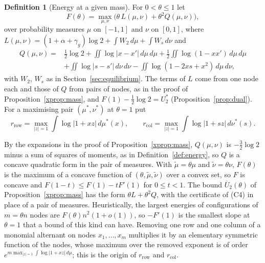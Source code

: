 \documentclass[11pt]{article}
\theoremstyle{definition}
\newtheorem{definition}[theorem]{Definition}
\begin{document}
\begin{definition}[Energy at a given mass]\label{xdef:Fmass}
For $0<\theta\le1$ let
\[
F(\theta)=\max_{\mu,\nu}\Big(\theta\,L(\mu,\nu)+\theta^2Q(\mu,\nu)\Big),
\]
over probability measures $\mu$ on $[-1,1]$ and $\nu$ on $[0,1]$, where $L(\mu,\nu)=(1+\alpha+\gamma_g)\log2+\int W_2\,d\mu+\int W_s\,d\nu$ and
\[
\begin{aligned}Q(\mu,\nu)={}&\tfrac12\log2+\iint\log|x-x'|\,d\mu\,d\mu+\tfrac12\iint\log(1-xx')\,d\mu\,d\mu\\&+\iint\log|s-s'|\,d\nu\,d\nu-\iint\log(1-2xs+x^2)\,d\mu\,d\nu,\end{aligned}
\]
with $W_2$, $W_s$ as in Section~\ref{sec:equilibrium}. The terms of $L$ come from one node each and those of $Q$ from pairs of nodes, as in the proof of Proposition~\ref{xprop:mass}, and $F(1)-\frac12\log2=U_2^*$ (Proposition~\ref{prop:dual}). For a maximising pair $(\mu^*,\nu^*)$ at $\theta=1$ put
\[
r_{\mathrm{row}}=\max_{|z|=1}\int\log|1+xz|\,d\mu^*(x),\qquad r_{\mathrm{col}}=\max_{|z|=1}\int\log|1+sz|\,d\nu^*(s).
\]
\end{definition}

By the expansions in the proof of Proposition~\ref{xprop:mass}, $Q(\mu,\nu)$ is $-\frac32\log2$ minus a sum of squares of moments, as in Definition~\ref{def:energy}, so $Q$ is a concave quadratic form in the pair of measures. With $\tilde\mu=\theta\mu$ and $\tilde\nu=\theta\nu$, $F(\theta)$ is the maximum of a concave function of $(\theta,\tilde\mu,\tilde\nu)$ over a convex set, so $F$ is concave and $F(1-t)\le F(1)-tF'(1)$ for $0\le t<1$. The bound $\overline U_2(\theta)$ of Proposition~\ref{xprop:mass} has the form $\theta L+\theta^2Q$, with the certificate of (C4) in place of a pair of measures. Heuristically, the largest energies of configurations of $m=\theta n$ nodes are $F(\theta)n^2(1+o(1))$, so $-F'(1)$ is the smallest slope at $\theta=1$ that a bound of this kind can have. Removing one row and one column of a monomial alternant on nodes $x_1,\dots,x_m$ multiplies it by an elementary symmetric function of the nodes, whose maximum over the removed exponent is of order $e^{m\max_{|z|=1}\int\log|1+xz|\,d\mu}$; this is the origin of $r_{\mathrm{row}}$ and $r_{\mathrm{col}}$.
\end{document}
